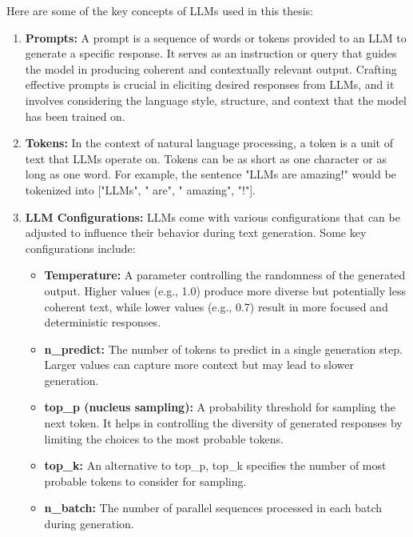 Here are some of the key concepts of LLMs used in this thesis:
\begin{enumerate}
    \item \textbf{Prompts:} A prompt is a sequence of words or tokens provided to an LLM to generate a specific response. It serves as an instruction or query that guides the model in producing coherent and contextually relevant output. Crafting effective prompts is crucial in eliciting desired responses from LLMs, and it involves considering the language style, structure, and context that the model has been trained on.

    \item \textbf{Tokens:} In the context of natural language processing, a token is a unit of text that LLMs operate on. Tokens can be as short as one character or as long as one word. For example, the sentence "LLMs are amazing!" would be tokenized into ["LLMs", " are", " amazing", "!"].

    \item \textbf{LLM Configurations:} LLMs come with various configurations that can be adjusted to influence their behavior during text generation. Some key configurations include:

        \begin{itemize}
            \item \textbf{Temperature:} A parameter controlling the randomness of the generated output. Higher values (e.g., 1.0) produce more diverse but potentially less coherent text, while lower values (e.g., 0.7) result in more focused and deterministic responses.

            \item \textbf{n\_predict:} The number of tokens to predict in a single generation step. Larger values can capture more context but may lead to slower generation.

            \item \textbf{top\_p (nucleus sampling):} A probability threshold for sampling the next token. It helps in controlling the diversity of generated responses by limiting the choices to the most probable tokens.

            \item \textbf{top\_k:} An alternative to top\_p, top\_k specifies the number of most probable tokens to consider for sampling.

            \item \textbf{n\_batch:} The number of parallel sequences processed in each batch during generation.
            

\end{itemize}
\end{enumerate}

